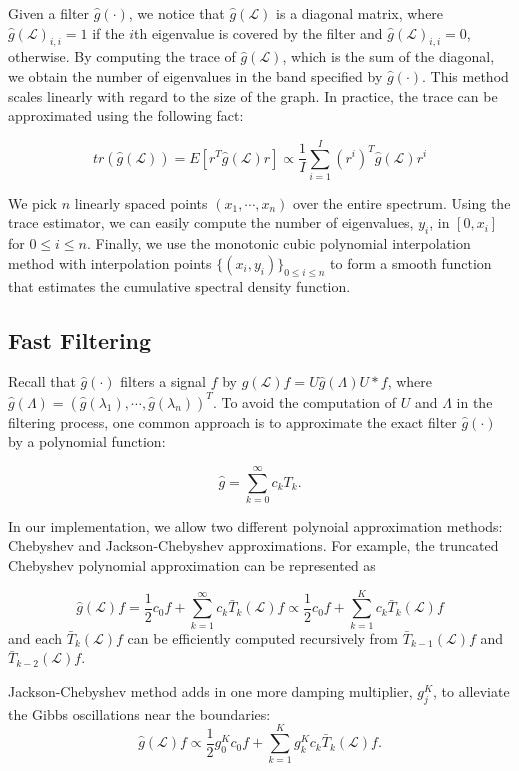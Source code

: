 \documentclass[a4paper]{article}
\newcommand{\La}{\mathcal{L}}
\theoremstyle{definition}
\begin{document}
Given a filter $\hat{g}(\cdot)$, we notice that $\hat{g}(\La)$ is a diagonal matrix, where $\hat{g}(\La)_{i,i} = 1$ if the $i$th eigenvalue is covered by the filter and $\hat{g}(\La)_{i,i} = 0$, otherwise. By computing the trace of $\hat{g}(\La)$, which is the sum of the diagonal, we obtain the number of eigenvalues in the band specified by $\hat{g}(\cdot)$. This method scales linearly with regard to the size of the graph. In practice, the trace can be approximated using the following fact:

$$tr(\hat{g}(\La)) = E[r^T\hat{g}(\La)r] \propto \frac{1}{I}\sum_{i =1}^{I} (r^{i})^T\hat{g}(\La)r^{i}$$

We pick $n$ linearly spaced points $(x_1, \cdots, x_n)$ over the entire spectrum. Using the trace estimator, we can easily compute the number of eigenvalues, $y_i$, in $[0, x_i]$ for $0\leq i \leq n$. Finally, we use the monotonic cubic polynomial interpolation method with interpolation points $\{(x_i, y_i)\}_{0\leq i \leq n}$ to form a smooth function that estimates the cumulative spectral density function.


\subsection{Fast Filtering}

Recall that $\hat{g}(\cdot)$ filters a signal $f$ by $\hat{g}(\La) f = U\hat{g}(\Lambda)U*f$, where $\hat{g}(\Lambda) = (\hat{g}(\lambda_1), \cdots, \hat{g}(\lambda_n))^T.$  To avoid the computation of $U$ and $\Lambda$ in the filtering process, one common approach is to approximate the exact filter $\hat{g}(\cdot)$ by a polynomial function:

$$\hat{g} = \sum_{k = 0}^{\infty} c_kT_k.$$

In our implementation, we allow two different polynoial approximation methods: Chebyshev and Jackson-Chebyshev approximations. For example, the truncated Chebyshev polynomial approximation can be represented as 

$$\hat{g}(\La)f = \frac{1}{2}c_0f + \sum_{k=1}^{\infty} c_k \bar{T}_k(\La)f \propto \frac{1}{2}c_0f + \sum_{k=1}^{K} c_k \bar{T}_k(\La)f$$ and each $\bar{T}_k(\La)f$ can be efficiently computed recursively from $\bar{T}_{k-1}(\La)f$ and $\bar{T}_{k-2}(\La)f$. 

Jackson-Chebyshev method adds in one more damping multiplier, $g_j^K$, to alleviate the Gibbs oscillations near the boundaries:
$$\hat{g}(\La)f \propto \frac{1}{2}g_0^Kc_0f + \sum_{k=1}^{K} g_k^Kc_k \bar{T}_k(\La)f.$$
\end{document}

